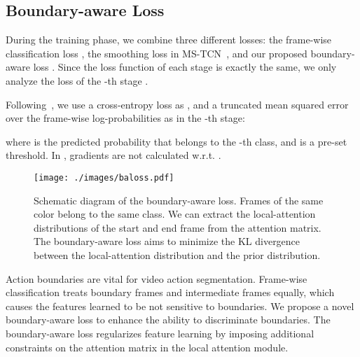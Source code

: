 \documentclass[letterpaper]{article} \usepackage[submission]{aaai23}  \usepackage{times}  \usepackage{helvet}  \usepackage{courier}  \usepackage[hyphens]{url}  \usepackage{graphicx} \urlstyle{rm} \def\UrlFont{\rm}  \usepackage{natbib}  \usepackage{caption} \frenchspacing  \setlength{\pdfpagewidth}{8.5in} \setlength{\pdfpageheight}{11in} \usepackage{algorithm}
\begin{document}
\subsection{Boundary-aware Loss}During the training phase, we combine three different losses: the frame-wise classification loss , the smoothing loss  in MS-TCN~\cite{farha2019ms}, and our proposed boundary-aware loss . Since the loss function of each stage is exactly the same, we only analyze the loss of the -th stage . 

Following~\cite{farha2019ms}, we use a cross-entropy loss as , and a truncated mean squared error over the frame-wise log-probabilities as  in the -th stage:
\begin{small}

\end{small}
\begin{small}

\end{small}
where  is the predicted probability that  belongs to the -th class, and  is a pre-set threshold. In , gradients are not calculated w.r.t. .


\begin{figure}[t]
\centering
\texttt{[image: ./images/baloss.pdf]} \caption{Schematic diagram of the boundary-aware loss. Frames of the same color belong to the same class. We can extract the local-attention distributions of the start and end frame from the attention matrix. The boundary-aware loss aims to minimize the KL divergence between the local-attention distribution and the prior distribution.}
\label{fig:BALoss}
\end{figure}


Action boundaries are vital for video action segmentation. Frame-wise classification treats boundary frames and intermediate frames equally, which causes the features learned to be not sensitive to boundaries. We propose a novel boundary-aware loss to enhance the ability to discriminate boundaries. The boundary-aware loss regularizes feature learning by imposing additional constraints on the attention matrix in the local attention module.
\end{document}

